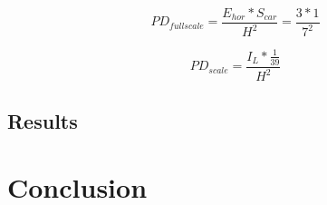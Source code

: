 \begin{equation}
\label{PD_FS}
	PD_{fullscale} = \frac{E_{hor} * S_{car}}{H^2} = \frac{3 * 1}{7^2}
\end{equation}

\begin{equation}
\label{PD_S}
	PD_{scale} = \frac{I_L * \frac{1}{39}}{H^2}
\end{equation}

\subsection{Results}

\section{Conclusion}